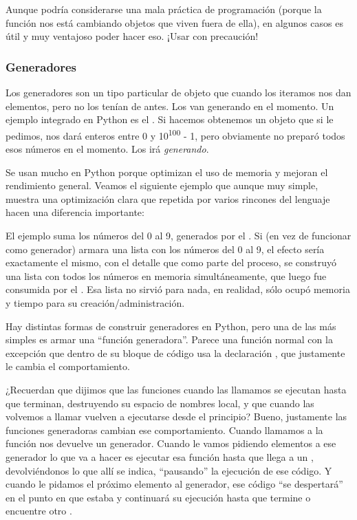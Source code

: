 
Aunque podría considerarse una mala práctica de programación (porque la función nos está cambiando objetos que viven fuera de ella), en algunos casos es útil y muy ventajoso poder hacer eso. ¡Usar con precaución!


\subsubsection{Generadores}

Los generadores son un tipo particular de objeto que cuando los iteramos nos dan elementos, pero no los tenían de antes. Los van generando en el momento. Un ejemplo integrado en Python es el . Si hacemos  obtenemos un objeto que si le pedimos, nos dará enteros entre 0 y 10\textsuperscript{100} - 1, pero obviamente no preparó todos esos números en el momento. Los irá \textit{generando}.

Se usan mucho en Python porque optimizan el uso de memoria y mejoran el rendimiento general. Veamos el siguiente ejemplo que aunque muy simple, muestra una optimización clara que repetida por varios rincones del lenguaje hacen una diferencia importante:


El ejemplo suma los números del 0 al 9, generados por el . Si  (en vez de funcionar como generador) armara una lista con los números del 0 al 9, el efecto sería exactamente el mismo, con el detalle que como parte del proceso, se construyó una lista con todos los números en memoria simultáneamente, que luego fue consumida por el . Esa lista no sirvió para nada, en realidad, sólo ocupó memoria y tiempo para su creación/administración.

Hay distintas formas de construir generadores en Python, pero una de las más simples es armar una ``función generadora''. Parece una función normal con la excepción que dentro de su bloque de código usa la declaración , que justamente le cambia el comportamiento.

¿Recuerdan que dijimos que las funciones cuando las llamamos se ejecutan hasta que terminan, destruyendo su espacio de nombres local, y que cuando las volvemos a llamar vuelven a ejecutarse desde el principio? Bueno, justamente las funciones generadoras cambian ese comportamiento. Cuando llamamos a la función nos devuelve un generador. Cuando le vamos pidiendo elementos a ese generador lo que va a hacer es ejecutar esa función hasta que llega a un , devolviéndonos lo que allí se indica, ``pausando'' la ejecución de ese código. Y cuando le pidamos el próximo elemento al generador, ese código ``se despertará'' en el punto en que estaba y continuará su ejecución hasta que termine o encuentre otro .

